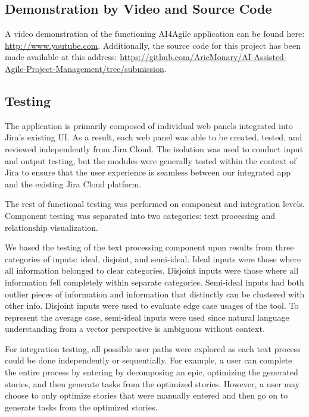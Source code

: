 \subsection{Demonstration by Video and Source Code}
A video demonstration of the functioning AI4Agile application can be found here: \url{http://www.youtube.com}. Additionally, the source code for this project has been made available at this address: \url{https://github.com/AricMonary/AI-Assisted-Agile-Project-Management/tree/submission}.

\subsection{Testing}

The application is primarily composed of individual web panels integrated into Jira’s existing UI. As a result, each web panel was able to be created, tested, and reviewed independently from Jira Cloud. The isolation was used to conduct input and output testing, but the modules were generally tested within the context of Jira to ensure that the user experience is seamless between our integrated app and the existing Jira Cloud platform.

The rest of functional testing was performed on component and integration levels. Component testing was separated into two categories: text processing and relationship visualization.

We based the testing of the text processing component upon results from three categories of inputs: ideal, disjoint, and semi-ideal. Ideal inputs were those where all information belonged to clear categories. Disjoint inputs were those where all information fell completely within separate categories. Semi-ideal inputs had both outlier pieces of information and information that distinctly can be clustered with other info. Disjoint inputs were used to evaluate edge case usages of the tool. To represent the average case, semi-ideal inputs were used since natural language understanding from a vector perspective is ambiguous without context.

For integration testing, all possible user paths were explored as each text process could be done independently or sequentially. For example, a user can complete the entire process by entering by decomposing an epic, optimizing the generated stories, and then generate tasks from the optimized stories. However, a user may choose to only optimize stories that were manually entered and then go on to generate tasks from the optimized stories. 

